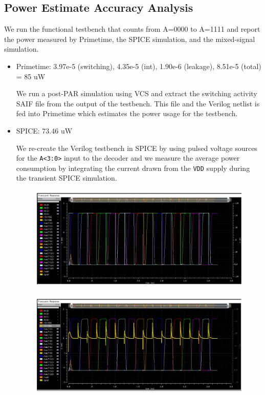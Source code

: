 \documentclass[11pt]{article}
\begin{document}
\subsection{Power Estimate Accuracy Analysis}
We run the functional testbench that counts from A=0000 to A=1111 and report the power measured by Primetime, the SPICE simulation, and the mixed-signal simulation.

\begin{itemize}
	\item Primetime: 3.97e-5 (switching), 4.35e-5 (int), 1.90e-6 (leakage), 8.51e-5 (total) = 85 uW
	
	We run a post-PAR simulation using VCS and extract the switching activity SAIF file from the output of the testbench. This file and the Verilog netlist is fed into Primetime which estimates the power usage for the testbench.
	
	\item SPICE: 73.46 uW
	
	We re-create the Verilog testbench in SPICE by using pulsed voltage sources for the \verb|A<3:0>| input to the decoder and we measure the average power consumption by integrating the current drawn from the \verb|VDD| supply during the transient SPICE simulation.
	
	\begin{figure}[H]
		\centerline{\includegraphics[height=5cm]{spice_power_switching.png}}
	\end{figure}
	
	\begin{figure}[H]
		\centerline{\includegraphics[height=5cm]{spice_power_current_draw.png}}
	\end{figure}


\end{itemize}
\end{document}
